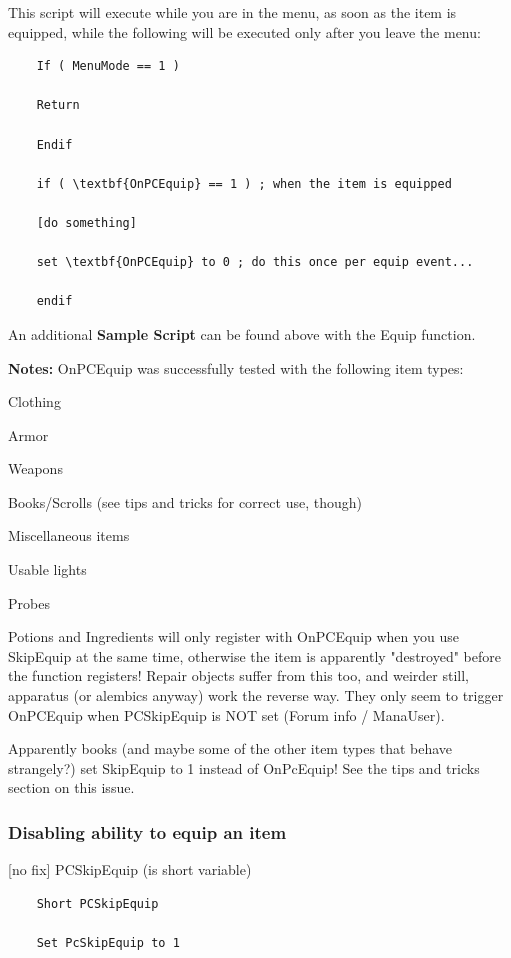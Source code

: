 This script will execute while you are in the menu, as soon as the item
is equipped, while the following will be executed only after you leave
the menu:

\begin{lstlisting}
	If ( MenuMode == 1 )
	
	Return
	
	Endif
	
	if ( \textbf{OnPCEquip} == 1 ) ; when the item is equipped
	
	[do something]
	
	set \textbf{OnPCEquip} to 0 ; do this once per equip event...
	
	endif
\end{lstlisting}

An additional \textbf{Sample Script} can be found above with the Equip
function.

\textbf{Notes:} OnPCEquip was successfully tested with the following
item types:

Clothing

Armor

Weapons

Books/Scrolls (see tips and tricks for correct use, though)

Miscellaneous items

Usable lights

Probes

Potions and Ingredients will only register with OnPCEquip when you use
SkipEquip at the same time, otherwise the item is apparently "destroyed"
before the function registers! Repair objects suffer from this too, and
weirder still, apparatus (or alembics anyway) work the reverse way. They
only seem to trigger OnPCEquip when PCSkipEquip is NOT set (Forum info /
ManaUser).

Apparently books (and maybe some of the other item types that behave
strangely?) set SkipEquip to 1 instead of OnPcEquip! See the tips and
tricks section on this issue.

\hypertarget{disabling-ability-to-equip-an-item}{%
\subsubsection{Disabling ability to equip an
item}\label{disabling-ability-to-equip-an-item}}

{[}no fix{]} PCSkipEquip (is short variable)

\begin{lstlisting}	
	Short PCSkipEquip
	
	Set PcSkipEquip to 1
\end{lstlisting}

